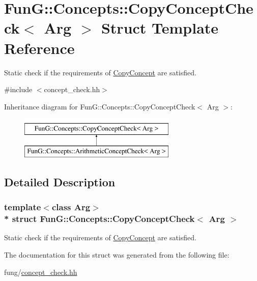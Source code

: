 \hypertarget{structFunG_1_1Concepts_1_1CopyConceptCheck}{}\section{FunG\+:\+:Concepts\+:\+:Copy\+Concept\+Check$<$ Arg $>$ Struct Template Reference}
\label{structFunG_1_1Concepts_1_1CopyConceptCheck}


Static check if the requirements of \hyperlink{structFunG_1_1Concepts_1_1CopyConcept}{Copy\+Concept} are satisfied.  




{\ttfamily \#include $<$concept\+\_\+check.\+hh$>$}

Inheritance diagram for FunG\+:\+:Concepts\+:\+:Copy\+Concept\+Check$<$ Arg $>$\+:\begin{figure}[H]
\begin{center}
\leavevmode
\includegraphics[height=2.000000cm]{structFunG_1_1Concepts_1_1CopyConceptCheck}
\end{center}
\end{figure}


\subsection{Detailed Description}
\subsubsection*{template$<$class Arg$>$\\*
struct Fun\+G\+::\+Concepts\+::\+Copy\+Concept\+Check$<$ Arg $>$}

Static check if the requirements of \hyperlink{structFunG_1_1Concepts_1_1CopyConcept}{Copy\+Concept} are satisfied. 

The documentation for this struct was generated from the following file\+:\begin{DoxyCompactItemize}
\item 
fung/\hyperlink{concept__check_8hh}{concept\+\_\+check.\+hh}\end{DoxyCompactItemize}
